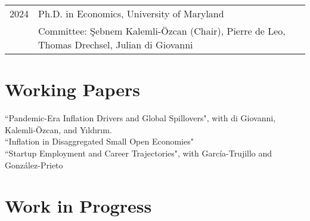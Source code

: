 \documentclass[10pt]{article}
\begin{document}
\begin{tabular}{@{}p{1.8cm}p{13cm}}
    2024 & Ph.D. in Economics, University of Maryland\\
   & \small Committee: \c{S}ebnem Kalemli-\"{O}zcan (Chair), Pierre de Leo, Thomas Drechsel, Julian di Giovanni\\
\end{tabular}


\section*{Working Papers}

\noindent ``Pandemic-Era Inflation Drivers and Global Spillovers", with di Giovanni, Kalemli-\"{O}zcan, and Y{\i}ld{\i}r{\i}m. \\[-0.125in]

\noindent ``Inflation in Disaggregated Small Open Economies"\\[-0.125in]

\noindent ``Startup Employment and Career Trajectories", with Garc\'ia-Trujillo and Gonz\'alez-Prieto





\section*{Work in Progress}
\end{document}
